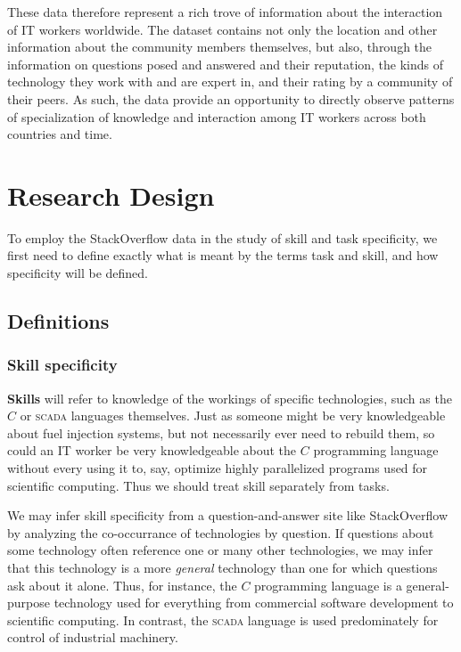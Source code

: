 \documentclass[11pt]{article}
\begin{document}
These data therefore represent a rich trove of information about the
interaction of IT workers worldwide. The dataset contains not only the location
and other information about the community members themselves, but also,
through the information on questions posed and answered and their reputation, the
kinds of technology they work with and are expert in, and their rating by
a community of their peers. As such, the data provide an opportunity
to directly observe patterns of specialization of knowledge and
interaction among IT workers across both countries and time. 


 


\section{Research Design}
\label{sec:research-design}

To employ the StackOverflow data in the study of skill and task
specificity, we first need to define exactly what is meant by the
terms task and skill, and how specificity will be defined. 

\subsection{Definitions}
\label{sec:definitions}

\subsubsection{Skill specificity}
\label{sec:skill-specificity}

\textbf{Skills} will refer to knowledge of the workings of specific
technologies, such as the $C$ or \textsc{scada} languages
themselves. Just as someone might be very knowledgeable about fuel
injection systems, but not necessarily ever need to rebuild them, so
could an IT worker be very knowledgeable about the $C$ programming
language without every using it to, say, optimize highly parallelized
programs used for scientific computing. Thus we should treat skill
separately from tasks. 

We may infer skill specificity from a question-and-answer site
like StackOverflow by analyzing the co-occurrance of technologies by
question. If questions about some technology often reference one or
many other technologies, we may infer that this technology is a more
\textit{general} technology than one for which questions ask about it
alone. Thus, for instance, the $C$ programming language is a
general-purpose technology used for everything from commercial
software development to scientific computing. In contrast, the
\textsc{scada} language is used predominately for control of
industrial machinery. 
\end{document}
